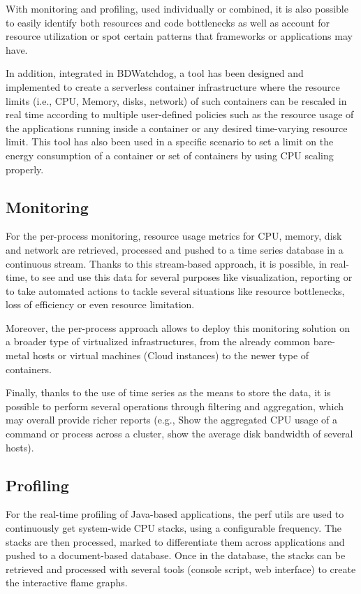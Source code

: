 \documentclass[12pt]{article}
\begin{document}
With monitoring and profiling, used individually or combined, it is also possible to easily identify both resources and code bottlenecks as well as account for resource utilization or spot certain patterns that frameworks or applications may have.

In addition, integrated in BDWatchdog, a tool has been designed and implemented to create a serverless container infrastructure where the resource limits (i.e., CPU, Memory, disks, network) of such containers can be rescaled in real time according to multiple user-defined policies such as the resource usage of the applications running inside a container or any desired time-varying resource limit. This tool has also been used in a specific scenario to set a limit on the energy consumption of a container or set of containers by using CPU scaling properly.

\subsection{Monitoring}

For the per-process monitoring, resource usage metrics for CPU, memory, disk and network are retrieved, processed and pushed to a time series database in a continuous stream. Thanks to this stream-based approach, it is possible, in real-time, to see and use this data for several purposes like visualization, reporting or to take automated actions to tackle several situations like resource bottlenecks, loss of efficiency or even resource limitation.

Moreover, the per-process approach allows to deploy this monitoring solution on a broader type of virtualized infrastructures, from the already common bare-metal hosts or virtual machines (Cloud instances) to the newer type of containers.

Finally, thanks to the use of time series as the means to store the data, it is possible to perform several operations through filtering and aggregation, which may overall provide richer reports (e.g., Show the aggregated CPU usage of a command or process across a cluster, show the average disk bandwidth of several hosts).

\subsection{Profiling}

For the real-time profiling of Java-based applications, the perf utils are used to continuously get system-wide CPU stacks, using a configurable frequency. The stacks are then processed, marked to differentiate them across applications and pushed to a document-based database. Once in the database, the stacks can be retrieved and processed with several tools (console script, web interface) to create the interactive flame graphs.
\end{document}
